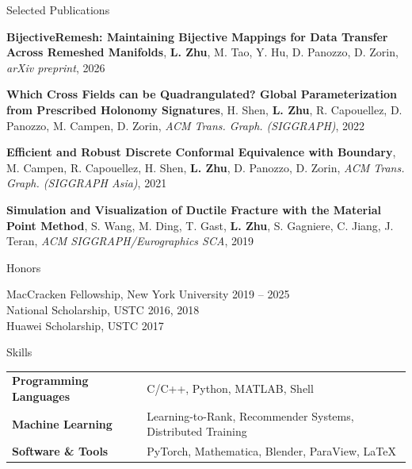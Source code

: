 \documentclass{resume} %
\begin{document}

\begin{rSection}{Selected Publications}

{\bf BijectiveRemesh: Maintaining Bijective Mappings for Data Transfer Across Remeshed Manifolds},
{\bf L. Zhu}, M. Tao, Y. Hu, D. Panozzo, D. Zorin,
\textit{arXiv preprint}, 2026

{\bf Which Cross Fields can be Quadrangulated? Global Parameterization from Prescribed Holonomy Signatures},
H. Shen, {\bf L. Zhu}, R. Capouellez, D. Panozzo, M. Campen, D. Zorin,
\textit{ACM Trans. Graph. (SIGGRAPH)}, 2022

{\bf Efficient and Robust Discrete Conformal Equivalence with Boundary},
M. Campen, R. Capouellez, H. Shen, {\bf L. Zhu}, D. Panozzo, D. Zorin,
\textit{ACM Trans. Graph. (SIGGRAPH Asia)}, 2021

{\bf Simulation and Visualization of Ductile Fracture with the Material Point Method},
S. Wang, M. Ding, T. Gast, {\bf L. Zhu}, S. Gagniere, C. Jiang, J. Teran,
\textit{ACM SIGGRAPH/Eurographics SCA}, 2019 

\end{rSection}


\begin{rSection}{Honors}

MacCracken Fellowship, New York University \hfill 2019 -- 2025\\
National Scholarship, USTC \hfill 2016, 2018\\
Huawei Scholarship, USTC \hfill 2017

\end{rSection}


\begin{rSection}{Skills}

\begin{tabular}{ @{} >{\bfseries}l @{\hspace{6ex}} l }
Programming Languages & C/C++, Python, MATLAB, Shell \\
Machine Learning & Learning-to-Rank, Recommender Systems, Distributed Training \\
Software \& Tools & PyTorch, Mathematica, Blender, ParaView, \LaTeX \\
\end{tabular}

\end{rSection}
\end{document}
